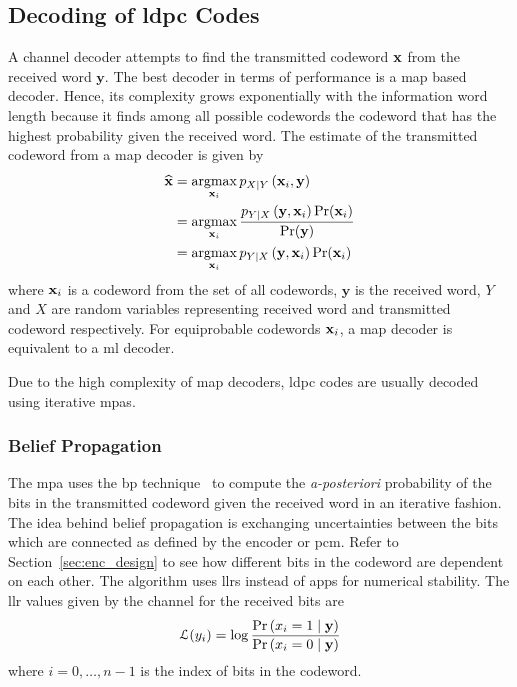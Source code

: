 \subsection{Decoding of \acl{ldpc} Codes}\label{sec:decoding_ldpc}
A channel decoder attempts to find the transmitted codeword $\mathbf{x}$ from the received word $\mathbf{y}$. The best decoder in terms of performance is a \ac{map} based decoder. Hence, its complexity grows exponentially with the information word length because it finds among all possible codewords the codeword that has the highest probability given the received word. The estimate of the transmitted codeword from a \ac{map} decoder is given by
\begin{align}
\widehat{\mathbf{x}}&=\operatorname*{argmax}_{\mathbf{x}_i}p_{X\mid Y}\left(\mathbf{x}_i,\mathbf{y}\right) \nonumber\\
&=\operatorname*{argmax}_{\mathbf{x}_i}\frac{p_{Y\mid X}\left(\mathbf{y},\mathbf{x}_i\right)\text{Pr}(\mathbf{x}_i)}{\text{Pr}(\mathbf{y})} \nonumber\\
&=\operatorname*{argmax}_{\mathbf{x}_i}p_{Y\mid X}\left(\mathbf{y},\mathbf{x}_i\right)\text{Pr}(\mathbf{x}_i)
\end{align}
where $\mathbf{x}_i$ is a codeword from the set of all codewords, $\mathbf{y}$ is the received word, $Y$ and $X$ are random variables representing received word and transmitted codeword respectively. For equiprobable codewords $\mathbf{x}_i$, a \ac{map} decoder is equivalent to a \ac{ml} decoder.

Due to the high complexity of \ac{map} decoders, \ac{ldpc} codes are usually decoded using iterative \acfp{mpa}.
\subsubsection{Belief Propagation}
The \ac{mpa} uses the \ac{bp} technique~\cite{Hagenauer1996} to compute the \emph{a-posteriori} probability of the bits in the transmitted codeword given the received word in an iterative fashion. The idea behind belief propagation is exchanging uncertainties between the bits which are connected as defined by the encoder or \ac{pcm}. Refer to Section~\ref{sec:enc_design} to see how different bits in the codeword are dependent on each other. The algorithm uses \acp{llr} instead of \acp{app} for numerical stability. The \ac{llr} values given by the channel for the received bits are
\begin{align}\mathcal{L}(y_i)=\log\frac{\text{Pr}\left(x_i=1\mid\mathbf{y}\right)}{\text{Pr}\left(x_i=0\mid\mathbf{y}\right)}\end{align}
where $i=0,\dots,n-1$ is the index of bits in the codeword.

